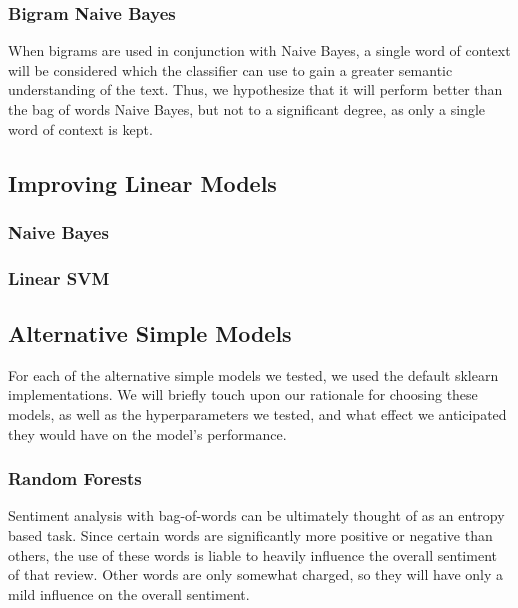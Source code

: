 \documentclass[conference]{IEEEtran}
\begin{document}
\subsubsection{Bigram Naive Bayes}

When bigrams are used in conjunction with Naive Bayes, a single word of context will be considered which the classifier can use to gain a greater semantic understanding of the text. Thus, we hypothesize that it will perform better than the bag of words Naive Bayes, but not to a significant degree, as only a single word of context is kept.

\subsection{Improving Linear Models}


\subsubsection{Naive Bayes}


\subsubsection{Linear SVM}


\subsection{Alternative Simple Models}

For each of the alternative simple models we tested, we used the default sklearn implementations. We will briefly touch upon our rationale for choosing these models, as well as the hyperparameters we tested, and what effect we anticipated they would have on the model's performance.

\subsubsection{Random Forests}

Sentiment analysis with bag-of-words can be ultimately thought of as an entropy based task. Since certain words are significantly more positive or negative than others, the use of these words is liable to heavily influence the overall sentiment of that review. Other words are only somewhat charged, so they will have only a mild influence on the overall sentiment.
\end{document}
